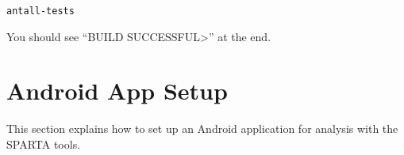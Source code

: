 \begin{enumerate}
\begin{alltt}
ant all-tests
\end{alltt}

You should see ``\<BUILD SUCCESSFUL>'' at the end.


%
%
%
%

\end{enumerate}


\section{Android App Setup\label{sec:antsetup}}

This section explains how to set up an Android application for analysis with the SPARTA tools.

